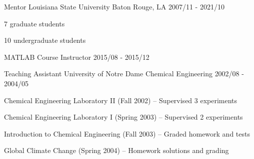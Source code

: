 
\begin{cventries}

  \cventry
    {Mentor} %
    {Louisiana State University} %
    {Baton Rouge, LA} %
    {2007/11 - 2021/10} %
    {
      \begin{cvitems} %
        \item {7 graduate students} %
        \item {10 undergraduate students} %
      \end{cvitems}
    }

  \cventry
    {MATLAB Course Instructor} %
    {} %
    {} %
    {2015/08 - 2015/12} %
    {}
  \vspace{-10pt}

  \cventry
    {Teaching Assistant} %
    {University of Notre Dame} %
    {Chemical Engineering} %
    {2002/08 - 2004/05} %
    {
      \begin{cvitems} %
        \item {Chemical Engineering Laboratory II (Fall 2002) – Supervised 3 experiments}
        \item{Chemical Engineering Laboratory I (Spring 2003) – Supervised 2 experiments}
        \item{Introduction to Chemical Engineering (Fall 2003) – Graded homework and tests}
        \item{Global Climate Change (Spring 2004) – Homework solutions and grading}
      \end{cvitems}
    }
    
\end{cventries}